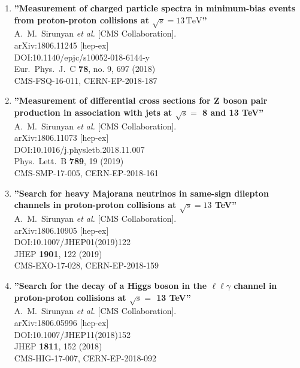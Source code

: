 \begin{enumerate}
\item%
{\bf ''Measurement of charged particle spectra in minimum-bias events from proton-proton collisions at $\sqrt{s}=13\,\text {TeV} $''}
  \\{}A.~M.~Sirunyan {\it et al.} [CMS Collaboration].
  \\{}arXiv:1806.11245 [hep-ex]
  \\{}DOI:10.1140/epjc/s10052-018-6144-y
  \\{}Eur.\ Phys.\ J.\ C {\bf 78}, no. 9, 697 (2018)
  \\{}CMS-FSQ-16-011, CERN-EP-2018-187

\item%
{\bf ''Measurement of differential cross sections for Z boson pair production in association with jets at $\sqrt{s} =$ 8 and 13 TeV''}
  \\{}A.~M.~Sirunyan {\it et al.} [CMS Collaboration].
  \\{}arXiv:1806.11073 [hep-ex]
  \\{}DOI:10.1016/j.physletb.2018.11.007
  \\{}Phys.\ Lett.\ B {\bf 789}, 19 (2019)
  \\{}CMS-SMP-17-005, CERN-EP-2018-161

\item%
{\bf ''Search for heavy Majorana neutrinos in same-sign dilepton channels in proton-proton collisions at $ \sqrt{s}=13 $ TeV''}
  \\{}A.~M.~Sirunyan {\it et al.} [CMS Collaboration].
  \\{}arXiv:1806.10905 [hep-ex]
  \\{}DOI:10.1007/JHEP01(2019)122
  \\{}JHEP {\bf 1901}, 122 (2019)
  \\{}CMS-EXO-17-028, CERN-EP-2018-159

\item%
{\bf ''Search for the decay of a Higgs boson in the $\ell\ell\gamma$ channel in proton-proton collisions at $\sqrt{s} =$ 13 TeV''}
  \\{}A.~M.~Sirunyan {\it et al.} [CMS Collaboration].
  \\{}arXiv:1806.05996 [hep-ex]
  \\{}DOI:10.1007/JHEP11(2018)152
  \\{}JHEP {\bf 1811}, 152 (2018)
  \\{}CMS-HIG-17-007, CERN-EP-2018-092


\end{enumerate}
